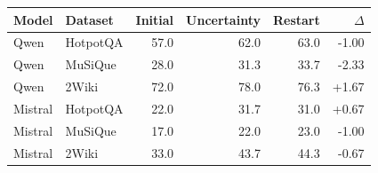 \begin{tabular}{@{}llrrrr@{}}
\toprule
Model & Dataset & Initial & Uncertainty & Restart & $\Delta$ \\
\midrule
Qwen & HotpotQA & 57.0 & 62.0 & 63.0 & -1.00 \\
Qwen & MuSiQue & 28.0 & 31.3 & 33.7 & -2.33 \\
Qwen & 2Wiki & 72.0 & 78.0 & 76.3 & +1.67 \\
Mistral & HotpotQA & 22.0 & 31.7 & 31.0 & +0.67 \\
Mistral & MuSiQue & 17.0 & 22.0 & 23.0 & -1.00 \\
Mistral & 2Wiki & 33.0 & 43.7 & 44.3 & -0.67 \\
\bottomrule
\end{tabular}
